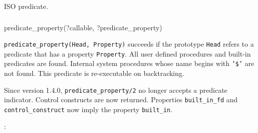 \Portability

ISO predicate.

\subsubsection{\label{predicate-property/2}}

\begin{TemplatesOneCol}
predicate\_property(?callable, ?predicate\_property)

\end{TemplatesOneCol}

\Description

\texttt{predicate\_property(Head, Property)} succeeds if the prototype
\texttt{Head} refers to a predicate that has a property \texttt{Property}. All
user defined procedures and built-in predicates are found. Internal system
procedures whose name begins with \texttt{'\$'} are not found. This predicate is
re-executable on backtracking.

Since version 1.4.0, \texttt{predicate\_property/2} no longer accepts a
predicate indicator. Control constructs are now returned. Properties
\texttt{built\_in\_fd} and \texttt{control\_construct} now imply the property
\texttt{built\_in}.

:

